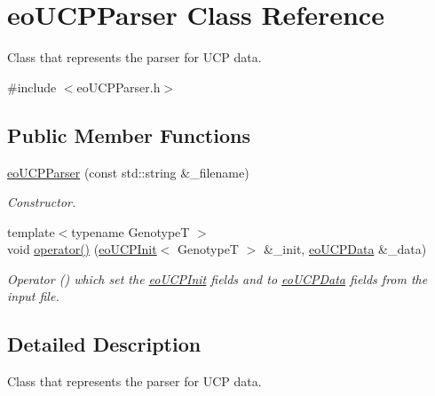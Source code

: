\hypertarget{classeo_u_c_p_parser}{\section{eo\-U\-C\-P\-Parser \-Class \-Reference}
\label{classeo_u_c_p_parser}
}


\-Class that represents the parser for \-U\-C\-P data.  




{\ttfamily \#include $<$eo\-U\-C\-P\-Parser.\-h$>$}

\subsection*{\-Public \-Member \-Functions}
\begin{DoxyCompactItemize}
\item 
\hyperlink{classeo_u_c_p_parser_ab40e92f7d94956a1c0e5092a3c2201e8}{eo\-U\-C\-P\-Parser} (const std\-::string \&\-\_\-filename)
\begin{DoxyCompactList}\small\item\em \-Constructor. \end{DoxyCompactList}\item 
\hypertarget{classeo_u_c_p_parser_a1474d38da978578f64c96f3fc7b04e33}{{\footnotesize template$<$typename Genotype\-T $>$ }\\void \hyperlink{classeo_u_c_p_parser_a1474d38da978578f64c96f3fc7b04e33}{operator()} (\hyperlink{classeo_u_c_p_init}{eo\-U\-C\-P\-Init}$<$ \-Genotype\-T $>$ \&\-\_\-init, \hyperlink{classeo_u_c_p_data}{eo\-U\-C\-P\-Data} \&\-\_\-data)}\label{classeo_u_c_p_parser_a1474d38da978578f64c96f3fc7b04e33}

\begin{DoxyCompactList}\small\item\em \-Operator () which set the \hyperlink{classeo_u_c_p_init}{eo\-U\-C\-P\-Init} fields and to \hyperlink{classeo_u_c_p_data}{eo\-U\-C\-P\-Data} fields from the input file. \end{DoxyCompactList}\end{DoxyCompactItemize}


\subsection{\-Detailed \-Description}
\-Class that represents the parser for \-U\-C\-P data. 

